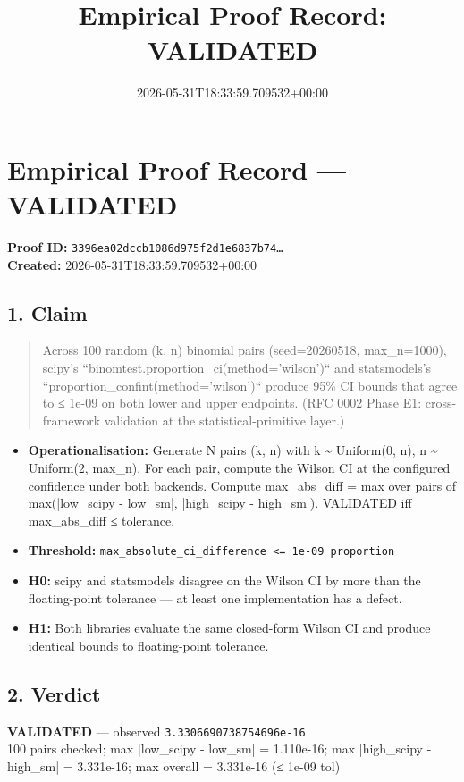 \documentclass{article}
\title{Empirical Proof Record: VALIDATED}
\date{2026-05-31T18:33:59.709532+00:00}
\begin{document}
\maketitle
\section*{Empirical Proof Record --- \textcolor{validated}{\textbf{VALIDATED}}}
\textbf{Proof ID:} \texttt{3396ea02dccb1086d975f2d1e6837b74\dots}\\
\textbf{Created:} 2026-05-31T18:33:59.709532+00:00
\subsection*{1. Claim}
\begin{quote}Across 100 random (k, n) binomial pairs (seed=20260518, max\_n=1000), scipy's ``binomtest.proportion\_ci(method='wilson')`` and statsmodels's ``proportion\_confint(method='wilson')`` produce 95\% CI bounds that agree to ≤ 1e-09 on both lower and upper endpoints. (RFC 0002 Phase E1: cross-framework validation at the statistical-primitive layer.)\end{quote}
\begin{itemize}
\item \textbf{Operationalisation:} Generate N pairs (k, n) with k \textasciitilde{} Uniform(0, n), n \textasciitilde{} Uniform(2, max\_n). For each pair, compute the Wilson CI at the configured confidence under both backends. Compute max\_abs\_diff = max over pairs of max(|low\_scipy - low\_sm|, |high\_scipy - high\_sm|). VALIDATED iff max\_abs\_diff ≤ tolerance.
\item \textbf{Threshold:} \texttt{max\_absolute\_ci\_difference <= 1e-09 proportion}
\item \textbf{H0:} scipy and statsmodels disagree on the Wilson CI by more than the floating-point tolerance — at least one implementation has a defect.
\item \textbf{H1:} Both libraries evaluate the same closed-form Wilson CI and produce identical bounds to floating-point tolerance.
\end{itemize}
\subsection*{2. Verdict}
\textcolor{validated}{\textbf{VALIDATED}} --- observed \texttt{3.3306690738754696e-16}\\
100 pairs checked; max |low\_scipy - low\_sm| = 1.110e-16; max |high\_scipy - high\_sm| = 3.331e-16; max overall = 3.331e-16 (≤ 1e-09 tol)
\end{document}
